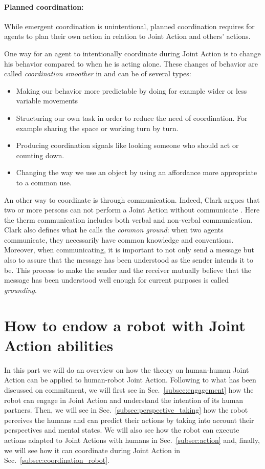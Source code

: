 \documentclass[english,a4paper,11pt,twoside]{StyleThese}
\begin{document}
\paragraph{Planned coordination:} 
While emergent coordination is unintentional, planned coordination requires for agents to plan their own action in relation to Joint Action and others' actions.

One way for an agent to intentionally coordinate during Joint Action is to change his behavior compared to when he is acting alone. These changes of behavior are called \textit{coordination smoother} in \cite{vesper2010minimal} and can be of several types:
\begin{itemize}
\item Making our behavior more predictable by doing for example wider or less variable movements
\item Structuring our own task in order to reduce the need of coordination. For example sharing the space or working turn by turn.
\item Producing coordination signals like looking someone who should act or counting down.
\item Changing the way we use an object by using an affordance more appropriate to a common use.
\end{itemize}

An other way to coordinate is through communication. Indeed, Clark argues that two or more persons can not perform a Joint Action without communicate \cite{clark1996using}. Here the therm communication includes both verbal and non-verbal communication. Clark also defines what he calls the \textit{common ground}: when two agents communicate, they necessarily have common knowledge and conventions. Moreover, when communicating, it is important to not only send a message but also to assure that the message has been understood as the sender intends it to be. This process to make the sender and the receiver mutually believe that the message has been understood well enough for current purposes is called \textit{grounding}.


\section{How to endow a robot with Joint Action abilities}

In this part we will do an overview on how the theory on human-human Joint Action can be applied to human-robot Joint Action. Following to what has been discussed on commitment, we will first see in Sec.~\ref{subsec:engagement} how the robot can engage in Joint Action and understand the intention of its human partners. Then, we will see in Sec.~\ref{subsec:perspective_taking} how the robot perceives the humans and can predict their actions by taking into account their perspectives and mental states. We will also see how the robot can execute actions adapted to Joint Actions with humans in Sec.~\ref{subsec:action} and, finally, we will see how it can coordinate during Joint Action in Sec.~\ref{subsec:coordination_robot}.
\end{document}
